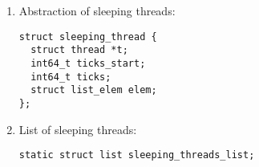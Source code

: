 \begin{enumerate}

\item Abstraction of sleeping threads:\\

\begin{lstlisting}
struct sleeping_thread {
  struct thread *t;
  int64_t ticks_start;
  int64_t ticks;
  struct list_elem elem;
};
\end{lstlisting}





\item List of sleeping threads:\\
\begin{lstlisting}
static struct list sleeping_threads_list;   
\end{lstlisting}

\end{enumerate}